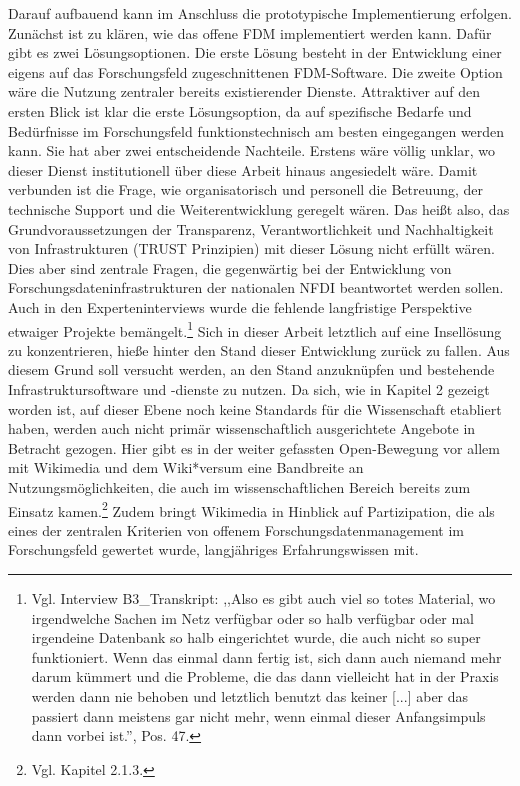 Darauf aufbauend kann im Anschluss die prototypische Implementierung erfolgen. Zunächst ist zu klären, wie das offene FDM implementiert werden kann. Dafür gibt es zwei Lösungsoptionen. Die erste Lösung besteht in der Entwicklung einer eigens auf das Forschungsfeld zugeschnittenen FDM-Software. Die zweite Option wäre die Nutzung zentraler bereits existierender Dienste. Attraktiver auf den ersten Blick ist klar die erste Lösungsoption, da auf spezifische Bedarfe und Bedürfnisse im Forschungsfeld funktionstechnisch am besten eingegangen werden kann. Sie hat aber zwei entscheidende Nachteile. Erstens wäre völlig unklar, wo dieser Dienst institutionell über diese Arbeit hinaus angesiedelt wäre. Damit verbunden ist die Frage, wie organisatorisch und personell die Betreuung, der technische Support und die Weiterentwicklung geregelt wären. Das heißt also, das Grundvoraussetzungen der Transparenz, Verantwortlichkeit und Nachhaltigkeit von Infrastrukturen (TRUST Prinzipien) mit dieser Lösung nicht erfüllt wären. Dies aber sind zentrale Fragen, die gegenwärtig bei der Entwicklung von Forschungsdateninfrastrukturen der nationalen NFDI beantwortet werden sollen. Auch in den Experteninterviews wurde die fehlende langfristige Perspektive etwaiger Projekte bemängelt.\footnote{Vgl. Interview B3\_Transkript: ,,Also es gibt auch viel so totes Material, wo irgendwelche Sachen im Netz verfügbar oder so halb verfügbar oder mal irgendeine Datenbank so halb eingerichtet wurde, die auch nicht so super funktioniert. Wenn das einmal dann fertig ist, sich dann auch niemand mehr darum kümmert und die Probleme, die das dann vielleicht hat in der Praxis werden dann nie behoben und letztlich benutzt das keiner [...] aber das passiert dann meistens gar nicht mehr, wenn einmal dieser Anfangsimpuls dann vorbei ist.'', Pos. 47.} Sich in dieser Arbeit letztlich auf eine Insellösung zu konzentrieren, hieße hinter den Stand dieser Entwicklung zurück zu fallen. Aus diesem Grund soll versucht werden, an den Stand anzuknüpfen und bestehende Infrastruktursoftware und -dienste zu nutzen. Da sich, wie in Kapitel 2 gezeigt worden ist, auf dieser Ebene noch keine Standards für die Wissenschaft etabliert haben, werden auch nicht primär wissenschaftlich ausgerichtete Angebote in Betracht gezogen. Hier gibt es in der weiter gefassten Open-Bewegung vor allem mit Wikimedia und dem Wiki*versum eine Bandbreite an Nutzungsmöglichkeiten, die auch im wissenschaftlichen Bereich bereits zum Einsatz kamen.\footnote{Vgl. Kapitel 2.1.3.} Zudem bringt Wikimedia in Hinblick auf Partizipation, die als eines der zentralen Kriterien von offenem Forschungsdatenmanagement im Forschungsfeld gewertet wurde, langjähriges Erfahrungswissen mit. 

